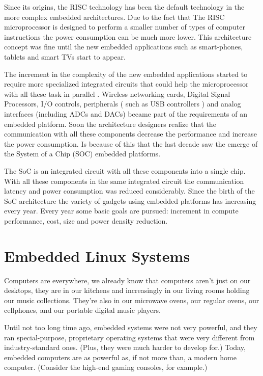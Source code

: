 Since its origins, the RISC technology has been the default technology in the
more complex embedded architectures. Due to the fact that The RISC
microprocessor is designed to perform a smaller number of types of computer
instructions the power consumption can be much more lower. This architecture
concept was fine until the new embedded applications such as smart-phones,
tablets and smart TVs start to appear.

The increment in the complexity of the new embedded applications started to
require more specialized integrated circuits that could help the microprocessor
with all these task in parallel . Wireless networking cards, Digital Signal
Processors, I/O controls, peripherals ( such as USB controllers ) and analog
interfaces (including ADCs and DACs) became part of the requirements of an
embedded platform. Soon the architecture designers realize that the
communication with all these components decrease the performance and increase
the power consumption. Is because of this that the last decade saw the emerge
of the System of a Chip (SOC)  embedded platforms. 

The SoC is an integrated circuit with all these components into a single chip.
With all these components in the same integrated circuit the communication
latency and power consumption was reduced considerably. Since the birth of the
SoC architecture the variety of gadgets using embedded platforms has increasing
every year.  Every year some basic goals are pursued:  increment in compute
performance, cost,  size and power density reduction.

\section{Embedded Linux Systems}

Computers are everywhere, we already know that computers aren't just on our
desktops, they are in our kitchens  and increasingly in our living rooms
holding our music collections. They're also in our microwave ovens, our regular
ovens, our cellphones, and our portable digital music players.

Until not too long time ago, embedded systems were not very powerful, and they
ran special-purpose, proprietary operating systems that were very different
from industry-standard ones. (Plus, they were much harder to develop for.)
Today, embedded computers are as powerful as, if not more than, a modern home
computer. (Consider the high-end gaming consoles, for example.)

